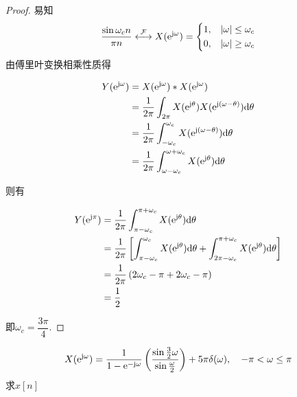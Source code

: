 \begin{proof}

    易知
    $$\dfrac{\sin{\omega_c n}}{{\pi n}} \stackrel{\mathcal{F}}{\longleftrightarrow} X(\mathrm{e}^{\mathrm{j} \omega}) = \left\{
        \begin{aligned}
            & 1, & |\omega| \leq \omega_c \\
            & 0, & |\omega| \geq \omega_c 
        \end{aligned}
        \right.
    $$
    由傅里叶变换相乘性质得
    
    \begin{align*}
        Y(\mathrm{e}^{\mathrm{j} \omega}) & = X(\mathrm{e}^{\mathrm{j} \omega}) \ast X(\mathrm{e}^{\mathrm{j} \omega}) \\
        & = \dfrac{1}{2\pi} \int_{2\pi}{X(\mathrm{e}^{\mathrm{j} \theta}) X(\mathrm{e}^{\mathrm{j} (\omega - \theta)})}\mathrm{d} \theta \\
        & = \dfrac{1}{2\pi} \int_{-\omega_c}^{\omega_c}{X(\mathrm{e}^{\mathrm{j} (\omega - \theta)})}\mathrm{d} \theta \\
        & = \dfrac{1}{2\pi} \int_{\omega -\omega_c}^{\omega + \omega_c}{X(\mathrm{e}^{\mathrm{j} \theta})}\mathrm{d} \theta
    \end{align*}

    则有
    
    \begin{align*}
        Y(\mathrm{e}^{\mathrm{j} \pi}) & = \dfrac{1}{2\pi} \int_{\pi -\omega_c}^{\pi + \omega_c}{X(\mathrm{e}^{\mathrm{j} \theta})}\mathrm{d} \theta \\
        & = \dfrac{1}{2\pi} \left[\int_{\pi -\omega_c}^{\omega_c}{X(\mathrm{e}^{\mathrm{j} \theta})}\mathrm{d} \theta + \int_{2\pi - \omega_c}^{\pi + \omega_c}{X(\mathrm{e}^{\mathrm{j} \theta})}\mathrm{d} \theta \right] \\
        & = \dfrac{1}{2\pi} \left(2\omega_c - \pi + 2\omega_c - \pi\right) \\
        & = \dfrac{1}{2} 
    \end{align*}

    即$\omega_c = \dfrac{3\pi}{4}$.

\end{proof}

\begin{proposition}

    $$X(\mathrm{e}^{\mathrm{j} \omega}) = \dfrac{1}{1 - \mathrm{e}^{-\mathrm{j} \omega}}\left( \dfrac{\sin \frac{3}{2}\omega}{\sin \frac{\omega}{2}}\right) + 5\pi \delta(\omega), \quad -\pi < \omega \leq \pi$$
    求$x[n]$

\end{proposition}

